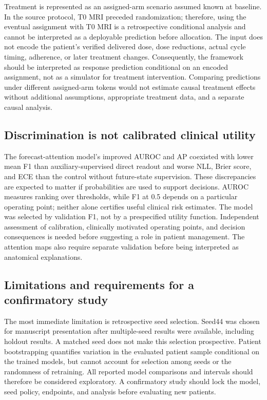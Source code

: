 Treatment is represented as an assigned-arm scenario assumed known at baseline. In the source protocol, T0 MRI preceded randomization; therefore, using the eventual assignment with T0 MRI is a retrospective conditional analysis and cannot be interpreted as a deployable prediction before allocation. The input does not encode the patient's verified delivered dose, dose reductions, actual cycle timing, adherence, or later treatment changes. Consequently, the framework should be interpreted as response prediction conditional on an encoded assignment, not as a simulator for treatment intervention. Comparing predictions under different assigned-arm tokens would not estimate causal treatment effects without additional assumptions, appropriate treatment data, and a separate causal analysis.

\subsection{Discrimination is not calibrated clinical utility}
The forecast-attention model's improved AUROC and AP coexisted with lower mean F1 than auxiliary-supervised direct readout and worse NLL, Brier score, and ECE than the control without future-state supervision. These discrepancies are expected to matter if probabilities are used to support decisions. AUROC measures ranking over thresholds, while F1 at 0.5 depends on a particular operating point; neither alone certifies useful clinical risk estimates. The model was selected by validation F1, not by a prespecified utility function. Independent assessment of calibration, clinically motivated operating points, and decision consequences is needed before suggesting a role in patient management. The attention maps also require separate validation before being interpreted as anatomical explanations.

\subsection{Limitations and requirements for a confirmatory study}
\label{sec:limitations}
The most immediate limitation is retrospective seed selection. Seed44 was chosen for manuscript presentation after multiple-seed results were available, including holdout results. A matched seed does not make this selection prospective. Patient bootstrapping quantifies variation in the evaluated patient sample conditional on the trained models, but cannot account for selection among seeds or the randomness of retraining. All reported model comparisons and intervals should therefore be considered exploratory. A confirmatory study should lock the model, seed policy, endpoints, and analysis before evaluating new patients.

